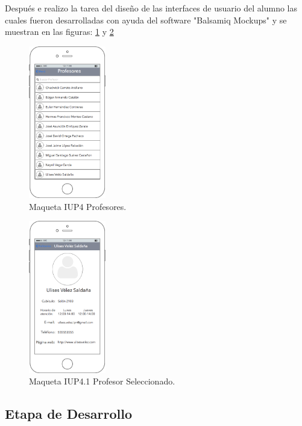 	 Después e realizo la tarea del diseño de las interfaces de usuario del alumno las cuales fueron desarrolladas con ayuda del software "Balsamiq Mockups" y se muestran en las figuras: \ref{fig:maquetaprofesor} y \ref{fig:maquetaprofesorSeleccionado}
	 \begin{figure}[h!]
	 	\begin{center}
	 		\includegraphics[width=0.3\textwidth]{images/maqueta/UIP4Profesores.png}
	 		\caption{Maqueta IUP4 Profesores.}
	 		\label{fig:maquetaprofesor}
	 	\end{center}
	 \end{figure}
 \begin{figure}[h!]
 	\begin{center}
 		\includegraphics[width=0.3\textwidth]{images/maqueta/UIP41ProfesorSeleccionado.png}
 		\caption{Maqueta IUP4.1 Profesor Seleccionado.}
 		\label{fig:maquetaprofesorSeleccionado}
 	\end{center}
 \end{figure}
	\subsection{Etapa de Desarrollo }
	 
